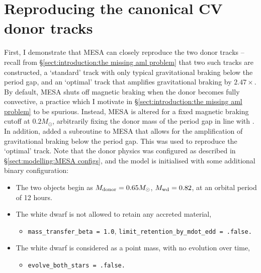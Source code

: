 \label{chpt:results:evolutionary modelling} %

\section{Reproducing the canonical CV donor tracks}
\label{sect:results:reproducing K11 tracks}

First, I demonstrate that MESA can closely reproduce the two \citet{knigge11} donor tracks -- recall from \S\ref{sect:introduction:the missing aml problem} that two such tracks are constructed, a `standard' track with only typical gravitational braking below the period gap, and an `optimal' track that amplifies gravitational braking by $2.47\times$.
By default, MESA shuts off magnetic braking when the donor becomes fully convective, a practice which I motivate in \S\ref{sect:introduction:the missing aml problem} to be spurious. Instead, MESA is altered for a fixed magnetic braking cutoff at $0.2 M_\odot$, arbitrarily fixing the donor mass of the period gap in line with \citet{knigge11}.
In addition, \citet{Pala2017a} added a subroutine to MESA that allows for the amplification of gravitational braking below the period gap. This was used to reproduce the `optimal' track. Note that the donor physics was configured as described in \S\ref{sect:modelling:MESA configs}, and the model is initialised with some additional binary configuration:
\begin{itemize}
    \item The two objects begin as $M_{\rm donor} = 0.65 M_\odot$, $M_{\rm wd} = 0.82$, at an orbital period of 12 hours.
    \item The white dwarf is not allowed to retain any accreted material,
    \begin{itemize}
        \item \lstinline{mass_transfer_beta = 1.0}, \lstinline{limit_retention_by_mdot_edd = .false.}
    \end{itemize}
    \item The white dwarf is considered as a point mass, with no evolution over time,
    \begin{itemize}
        \item \lstinline{evolve_both_stars = .false.}
    \end{itemize}
\end{itemize}

